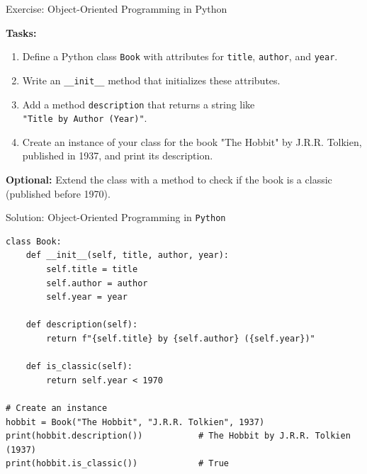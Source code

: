 \documentclass[10pt]{beamer}
\begin{document}
\begin{frame}{Exercise: Object-Oriented Programming in Python}

\textbf{Tasks:}
\begin{enumerate}
\item Define a Python class \texttt{Book} with attributes for \texttt{title}, \texttt{author}, and \texttt{year}.
\item Write an \texttt{\_\_init\_\_} method that initializes these attributes.
\item Add a method \texttt{description} that returns a string like \\
\texttt{"Title by Author (Year)"}.
\item Create an instance of your class for the book "The Hobbit" by J.R.R. Tolkien, published in 1937, and print its description.
\end{enumerate}

\vspace{2mm}
\textbf{Optional:} Extend the class with a method to check if the book is a classic (published before 1970).
\end{frame}

\begin{frame}[fragile]{Solution: Object-Oriented Programming in \texttt{Python}}
\begin{lstlisting}[style=mypython]
class Book:
	def __init__(self, title, author, year):
		self.title = title
		self.author = author
		self.year = year

	def description(self):
		return f"{self.title} by {self.author} ({self.year})"

	def is_classic(self):
		return self.year < 1970

# Create an instance
hobbit = Book("The Hobbit", "J.R.R. Tolkien", 1937)
print(hobbit.description())           # The Hobbit by J.R.R. Tolkien (1937)
print(hobbit.is_classic())            # True
\end{lstlisting}
\end{frame}
\end{document}
